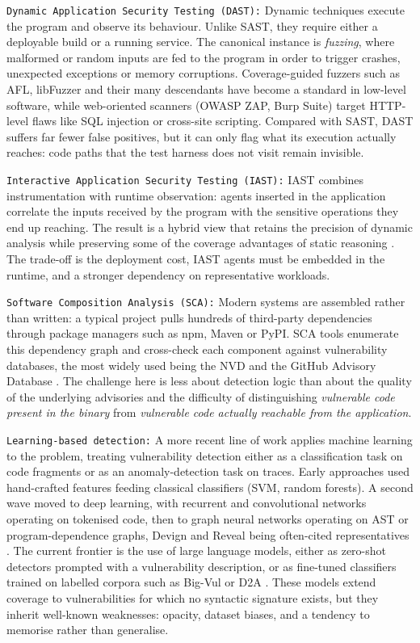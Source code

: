 \texttt{Dynamic Application Security Testing (DAST):}
Dynamic techniques execute the program and observe its behaviour. Unlike
SAST, they require either a deployable build or a running service. The
canonical instance is \emph{fuzzing}, where malformed or random inputs are
fed to the program in order to trigger crashes, unexpected exceptions or
memory corruptions. Coverage-guided fuzzers such as AFL, libFuzzer and
their many descendants \citep{placeholder-fuzzing} have become a standard
in low-level software, while web-oriented scanners (OWASP ZAP, Burp Suite)
target HTTP-level flaws like SQL injection or cross-site scripting.
Compared with SAST, DAST suffers far fewer false positives, but it can
only flag what its execution actually reaches: code paths that the test
harness does not visit remain invisible.

\texttt{Interactive Application Security Testing (IAST):}
IAST combines instrumentation with runtime observation: agents inserted in
the application correlate the inputs received by the program with the
sensitive operations they end up reaching. The result is a hybrid view
that retains the precision of dynamic analysis while preserving some of
the coverage advantages of static reasoning \citep{placeholder-iast}. The
trade-off is the deployment cost, IAST agents must be embedded in the
runtime, and a stronger dependency on representative workloads.

\texttt{Software Composition Analysis (SCA):}
Modern systems are assembled rather than written: a typical project pulls
hundreds of third-party dependencies through package managers such as npm,
Maven or PyPI. SCA tools enumerate this dependency graph and cross-check
each component against vulnerability databases, the most widely used being
the NVD and the GitHub Advisory Database \citep{placeholder-sca}. The
challenge here is less about detection logic than about the quality of
the underlying advisories and the difficulty of distinguishing
\emph{vulnerable code present in the binary} from \emph{vulnerable code
actually reachable from the application}.

\texttt{Learning-based detection:}
A more recent line of work applies machine learning to the problem,
treating vulnerability detection either as a classification task on code
fragments or as an anomaly-detection task on traces. Early approaches
used hand-crafted features feeding classical classifiers (SVM, random
forests). A second wave moved to deep learning, with recurrent and
convolutional networks operating on tokenised code, then to graph neural
networks operating on AST or program-dependence graphs, Devign and
Reveal being often-cited representatives \citep{placeholder-gnn}. The
current frontier is the use of large language models, either as zero-shot
detectors prompted with a vulnerability description, or as fine-tuned
classifiers trained on labelled corpora such as Big-Vul or D2A
\citep{placeholder-llm-detection}. These models extend coverage to
vulnerabilities for which no syntactic signature exists, but they
inherit well-known weaknesses: opacity, dataset biases, and a tendency
to memorise rather than generalise.

